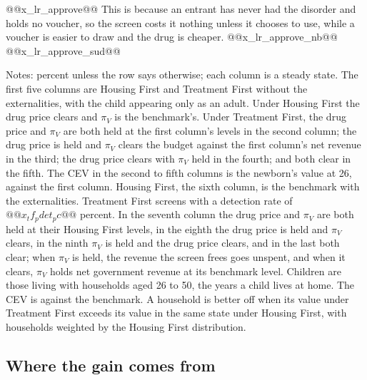 \documentclass[10pt]{article}
\newcommand{\notes}[2]{\par\vspace{0.4em}%
  \begin{minipage}{#1}\footnotesize #2\end{minipage}}
\newcommand{\tabnote}[1]{\notes{\wd\ntbox}{#1}}
\begin{document}
@@x_lr_approve@@ This is because an entrant has never had the disorder and holds no voucher, so the screen costs it nothing unless it chooses to use, while a voucher is easier to draw and the drug is cheaper. @@x_lr_approve_nb@@ @@x_lr_approve_sud@@



\begin{table}[!tb]\centering
\caption{The long run under each policy}\label{tab:longrun}
\begingroup\scriptsize\setlength{\tabcolsep}{3pt}
\sbox{\ntbox}{}\usebox{\ntbox}
\tabnote{Notes: percent unless the row says otherwise; each column is a steady state. The first five columns are Housing First and Treatment First without the externalities, with the child appearing only as an adult. Under Housing First the drug price clears and $\pi_V$ is the benchmark's. Under Treatment First, the drug price and $\pi_V$ are both held at the first column's levels in the second column; the drug price is held and $\pi_V$ clears the budget against the first column's net revenue in the third; the drug price clears with $\pi_V$ held in the fourth; and both clear in the fifth. The CEV in the second to fifth columns is the newborn's value at 26, against the first column.
Housing First, the sixth column, is the benchmark with the externalities. Treatment First screens with a detection rate of
$@@x_tf_pdet_pc@@$ percent. In the seventh column the drug price and $\pi_V$ are both held at their Housing First levels, in the eighth the drug price is held and $\pi_V$ clears, in the ninth $\pi_V$ is held and the drug price clears, and in the last both clear; when $\pi_V$ is held, the revenue the screen frees goes unspent, and when it clears, $\pi_V$ holds net government revenue at its benchmark level. Children are those living with households aged 26 to 50, the years a child lives at
home. The CEV is against the benchmark. A household is better off when its value under Treatment First exceeds
its value in the same state under Housing First, with households weighted by the Housing First distribution.}
\endgroup
\end{table}

\subsection{Where the gain comes from}\label{sec:parts}
\end{document}
